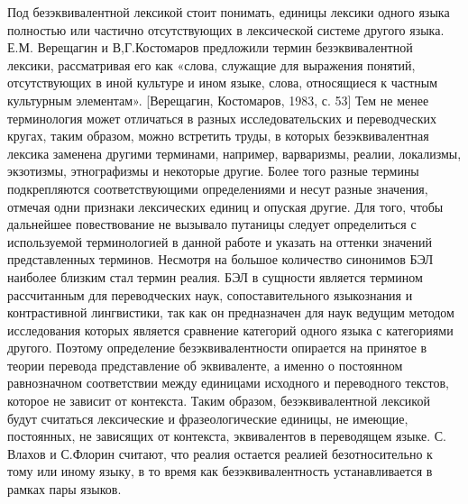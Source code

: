 \par Под безэквивалентной лексикой стоит понимать, единицы лексики одного языка полностью или частично отсутствующих в лексической системе другого языка. Е.М. Верещагин и В,Г.Костомаров предложили термин безэквивалентной лексики, рассматривая его как «слова, служащие для выражения понятий, отсутствующих в иной культуре и ином языке, слова, относящиеся к частным культурным элементам». [Верещагин, Костомаров, 1983, с. 53] Тем не менее терминология может отличаться в разных исследовательских и переводческих кругах, таким образом, можно встретить труды, в которых безэквивалентная лексика заменена другими  терминами, например, варваризмы, реалии, локализмы, экзотизмы, этнографизмы и некоторые другие. Более того разные термины подкрепляются соответствующими определениями и несут разные значения, отмечая одни признаки лексических единиц и опуская другие. Для того, чтобы дальнейшее повествование не вызывало путаницы следует определиться с используемой терминологией в данной работе и указать на оттенки значений представленных терминов. Несмотря на большое количество синонимов БЭЛ наиболее близким стал термин  реалия. БЭЛ в сущности является  термином рассчитанным для переводческих наук, сопоставительного языкознания и контрастивной лингвистики, так как он предназначен для наук  ведущим методом исследования которых является сравнение категорий одного языка с категориями другого. Поэтому  определение безэквивалентности опирается на принятое в теории перевода представление об эквиваленте, а именно о постоянном равнозначном соответствии между единицами исходного и переводного текстов, которое не зависит от контекста. Таким образом, безэквивалентной лексикой будут считаться лексические и фразеологические единицы, не имеющие, постоянных, не зависящих от контекста, эквивалентов в переводящем языке. С. Влахов и С.Флорин считают, что  реалия остается реалией безотносительно к тому или иному языку, в то время как безэквивалентность устанавливается в рамках пары языков.
